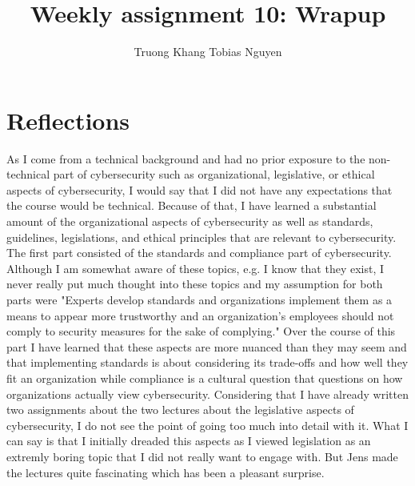 \documentclass[12pt]{article}
\title{Weekly assignment 10: Wrapup}
\author{Truong Khang Tobias Nguyen}
\date{}
\begin{document}
\maketitle

\section{Reflections}
As I come from a technical background and had no prior exposure to the non-technical part of cybersecurity such as organizational, legislative, or ethical aspects of cybersecurity, I would say that I did not have any expectations that the course would be technical. Because of that, I have learned a substantial amount of the organizational aspects of cybersecurity as well as standards, guidelines, legislations, and ethical principles that are relevant to cybersecurity.
\newline
The first part consisted of the standards and compliance part of cybersecurity. Although I am somewhat aware of these topics, e.g. I know that they exist, I never really put much thought into these topics and my assumption for both parts were "Experts develop standards and organizations implement them as a means to appear more trustworthy and an organization's employees should not comply to security measures for the sake of complying." Over the course of this part I have learned that these aspects are more nuanced than they may seem and that implementing standards is about considering its trade-offs and how well they fit an organization while compliance is a cultural question that questions on how organizations actually view cybersecurity.
\newline
Considering that I have already written two assignments about the two lectures about the legislative aspects of cybersecurity, I do not see the point of going too much into detail with it. What I can say is that I initially dreaded this aspects as I viewed legislation as an extremly boring topic that I did not really want to engage with. But Jens made the lectures quite fascinating which has been a pleasant surprise.
\newline
\end{document}
